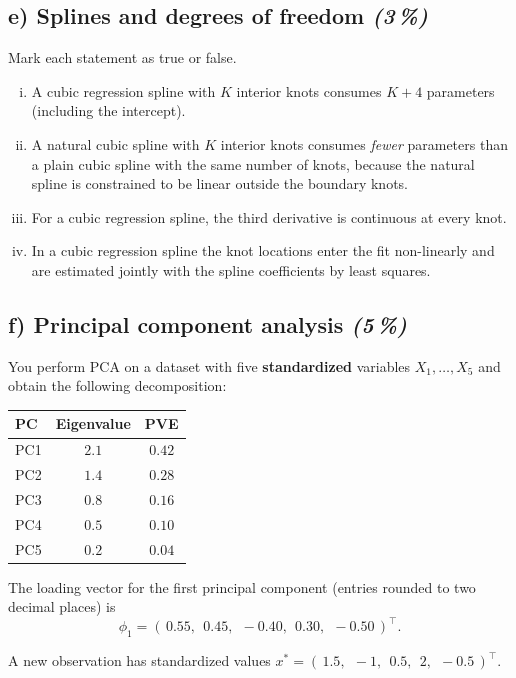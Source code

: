 \documentclass[11pt,a4paper]{article}
\newcommand{\subpoints}[1]{\textit{(#1\,\%)}}
\begin{document}
\subsection*{e) Splines and degrees of freedom \subpoints{3}}
Mark each statement as true or false.
\begin{enumerate}[(i)]
  \item A cubic regression spline with $K$ interior knots consumes $K+4$ parameters (including the intercept).
  \item A natural cubic spline with $K$ interior knots consumes \emph{fewer} parameters than a plain cubic spline with the same number of knots, because the natural spline is constrained to be linear outside the boundary knots.
  \item For a cubic regression spline, the third derivative is continuous at every knot.
  \item In a cubic regression spline the knot locations enter the fit non-linearly and are estimated jointly with the spline coefficients by least squares.
\end{enumerate}

\subsection*{f) Principal component analysis \subpoints{5}}
You perform PCA on a dataset with five \textbf{standardized} variables $X_1,\dots,X_5$ and obtain the following decomposition:
\begin{center}\small
\begin{tabular}{lcc}
\toprule
\textbf{PC} & \textbf{Eigenvalue} & \textbf{PVE} \\
\midrule
PC1 & $2.1$ & $0.42$ \\
PC2 & $1.4$ & $0.28$ \\
PC3 & $0.8$ & $0.16$ \\
PC4 & $0.5$ & $0.10$ \\
PC5 & $0.2$ & $0.04$ \\
\bottomrule
\end{tabular}
\end{center}

The loading vector for the first principal component (entries rounded to two decimal places) is
$$\phi_1 = (\,0.55,\;\, 0.45,\;\, -0.40,\;\, 0.30,\;\, -0.50\,)^\top.$$

A new observation has standardized values $x^* = (\,1.5,\;\, -1,\;\, 0.5,\;\, 2,\;\, -0.5\,)^\top$.
\end{document}
